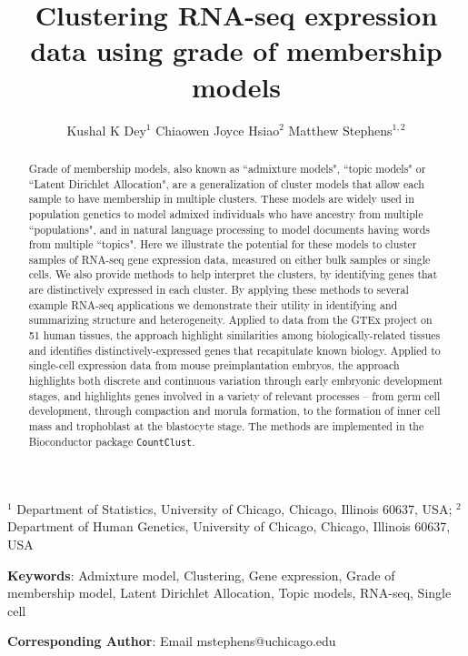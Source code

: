 \title{\Large{\textbf{Clustering RNA-seq expression data using grade of membership models}}}
\author{ Kushal K Dey$^{1}$  \qquad Chiaowen Joyce Hsiao$^{2}$ \qquad Matthew Stephens$^{1,2}$}

\maketitle

$^{1}$ Department of Statistics, University of Chicago, Chicago, Illinois 60637, USA;  $^{2}$ Department of Human Genetics, University of Chicago, Chicago, Illinois 60637, USA

\textbf{Keywords}: Admixture model, Clustering, Gene expression, Grade of membership model, Latent Dirichlet Allocation, Topic models, RNA-seq, Single cell

\textbf{Corresponding Author}: Email mstephens@uchicago.edu
					      


\newpage

\begin{abstract}
Grade of membership models, also known as ``admixture models", ``topic models" or ``Latent Dirichlet Allocation",
are a generalization of cluster models that allow each sample to have membership in multiple clusters.
These models are widely used in population genetics to model admixed individuals who have ancestry from multiple ``populations", 
and in natural language processing to model documents having words from multiple ``topics". Here we illustrate the potential for these models
to cluster samples of RNA-seq gene expression data, measured on either bulk samples or single cells. 
We also provide methods to help interpret the clusters, by identifying genes that are distinctively expressed in each cluster. 
By applying these methods to several example RNA-seq applications we demonstrate their utility in
identifying and summarizing structure and heterogeneity. Applied to
data from the GTEx project on 51 human tissues, the approach highlight similarities among biologically-related tissues and
identifies distinctively-expressed genes that recapitulate known biology.  Applied to single-cell expression data from 
mouse preimplantation embryos, the approach highlights both discrete and continuous variation through early embryonic development stages,
and highlights genes involved in a variety of relevant processes -- from germ cell development, through compaction and morula formation, to
the formation of inner cell mass and trophoblast at the blastocyte stage.
The methods are implemented in the Bioconductor package {\tt CountClust}.
\end{abstract}

